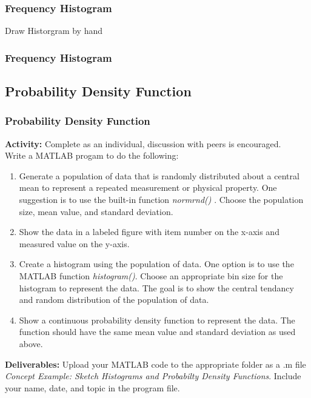 \documentclass[fleqn]{beamer} %
\newcommand{\sectionIsubsectionIIItitle}{Frequency Histogram}
\newcommand{\sectionIsubsectionIVtitle}{Probability Density Function}
\begin{document}
			\begin{frame} 
				\frametitle{\sectionIsubsectionIIItitle}
				\bigskip
				Draw Historgram by hand 
	

			\end{frame}

			\begin{frame} 
				\frametitle{\sectionIsubsectionIIItitle}
				\bigskip

	

			\end{frame}



		\subsection{\sectionIsubsectionIVtitle}\label{sectionIsubsectionIV}	

			\begin{frame} \scriptsize
				\frametitle{\sectionIsubsectionIVtitle}

				\bigskip
\textbf{Activity:} Complete as an individual, discussion with peers is encouraged.\\
      Write a MATLAB progam to do the following:
			\begin{enumerate}
		    \item Generate a population of data that is randomly distributed about a central mean to represent a repeated measurement or physical property. One suggestion is to use the built-in function {\it normrnd() }. Choose the population size, mean value, and standard deviation.
        \item Show the data in a labeled figure with item number on the x-axis and measured value on the y-axis.  
				\item Create a histogram using the population of data. One option is to use the MATLAB function {\it histogram()}. Choose an appropriate bin size for the histogram to represent the data. The goal is to show the central tendancy and random distribution of the population of data.
		    \item Show a continuous probability density function to represent the data. The function should have the same mean value and standard deviation as used above.
      	\end{enumerate}

		\textbf{Deliverables:} Upload your MATLAB code to the appropriate folder as a .m file {\it Concept Example: Sketch Histograms and Probabilty Density Functions}. Include your name, date, and topic in the program file.	

				
			\end{frame}
\end{document}
